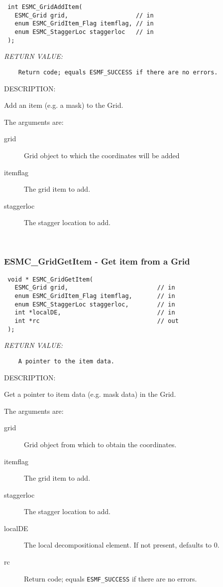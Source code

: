   
\begin{verbatim} int ESMC_GridAddItem(
   ESMC_Grid grid,                   // in
   enum ESMC_GridItem_Flag itemflag, // in
   enum ESMC_StaggerLoc staggerloc   // in
 );
 \end{verbatim}{\em RETURN VALUE:}
\begin{verbatim}    Return code; equals ESMF_SUCCESS if there are no errors.\end{verbatim}
{\sf DESCRIPTION:\\ }


    Add an item (e.g. a mask) to the Grid.
  
    The arguments are:
    \begin{description}
    \item[grid]
      Grid object to which the coordinates will be added
    \item[itemflag]
      The grid item to add.
    \item[staggerloc]
      The stagger location to add.
    \end{description}
   
 
\mbox{}\hrulefill\ 
 
\subsubsection [ESMC\_GridGetItem] {ESMC\_GridGetItem - Get item from a Grid}


  
\begin{verbatim} void * ESMC_GridGetItem(
   ESMC_Grid grid,                         // in
   enum ESMC_GridItem_Flag itemflag,       // in
   enum ESMC_StaggerLoc staggerloc,        // in
   int *localDE,                           // in
   int *rc                                 // out
 );
 \end{verbatim}{\em RETURN VALUE:}
\begin{verbatim}    A pointer to the item data. \end{verbatim}
{\sf DESCRIPTION:\\ }


    Get a pointer to item data (e.g. mask data) in the Grid.
  
    The arguments are:
    \begin{description}
    \item[grid]
      Grid object from which to obtain the coordinates.
    \item[itemflag]
      The grid item to add.
    \item[staggerloc]
      The stagger location to add.
    \item[localDE]
      The local decompositional element. If not present, defaults to 0.
    \item[rc]
    Return code; equals {\tt ESMF\_SUCCESS} if there are no errors. 
    \end{description}
   
